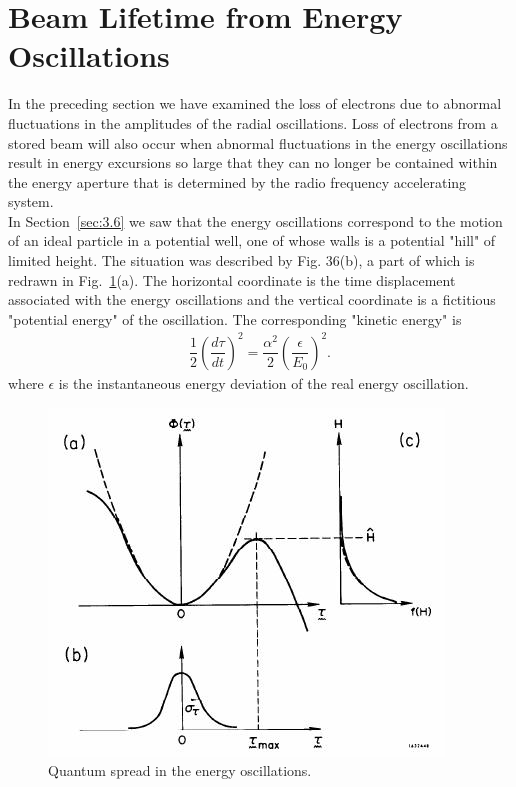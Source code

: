 \section{Beam Lifetime from Energy Oscillations} \label{eq:5.8}

In the preceding section we have examined the loss of electrons due to abnormal fluctuations in the amplitudes of the radial oscillations. Loss of electrons from a stored beam will also occur when abnormal fluctuations in the energy oscillations result in energy excursions so large that they can no longer be contained within the energy aperture that is determined by the radio frequency accelerating system.\\
In Section~\ref{sec:3.6} we saw that the energy oscillations correspond to the motion of an ideal particle in a potential well, one of whose walls is a potential "hill" of limited height. The situation was described by Fig. 36(b), a part of which is redrawn in Fig.~\ref{fig:fig48}(a). The horizontal coordinate is the time displacement associated with the energy oscillations and the vertical coordinate is a fictitious "potential energy" of the oscillation. The corresponding "kinetic energy" is
\begin{align} \label{eq:5.131}
	\dfrac{1}{2}\left( \dfrac{d\tau}{dt} \right)^2 = \dfrac{\alpha^2}{2} \left( \dfrac{\epsilon}{E_0} \right)^2.
\end{align}
where $\epsilon$ is the instantaneous energy deviation of the real energy oscillation.

\begin{figure}[!htb]
	\centering
	\includegraphics[width=0.8\linewidth]{./Figuras/fig48.jpeg}
	\caption{Quantum spread in the energy oscillations.}
	\label{fig:fig48}
\end{figure}

